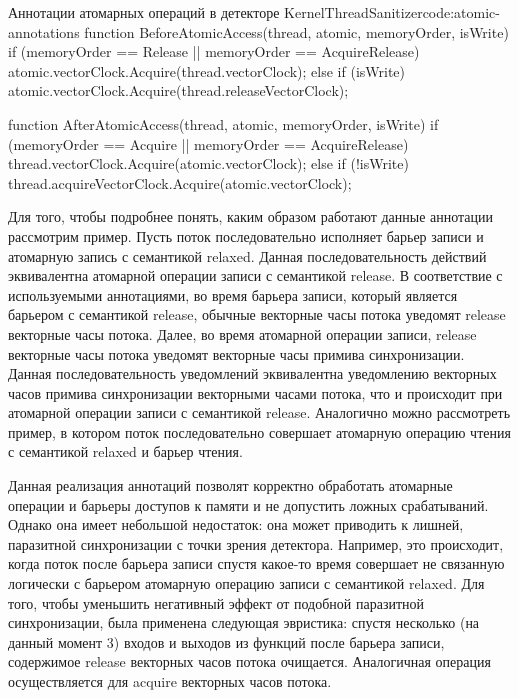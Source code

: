 \begin{listing}{Аннотации атомарных операций в детекторе KernelThreadSanitizer}{code:atomic-annotations}
function BeforeAtomicAccess(thread, atomic, memoryOrder, isWrite) {
  if (memoryOrder == Release || memoryOrder == AcquireRelease) {
    atomic.vectorClock.Acquire(thread.vectorClock);
  } else if (isWrite) {
    atomic.vectorClock.Acquire(thread.releaseVectorClock);
  }
}

function AfterAtomicAccess(thread, atomic, memoryOrder, isWrite) {
  if (memoryOrder == Acquire || memoryOrder == AcquireRelease) {
    thread.vectorClock.Acquire(atomic.vectorClock);
  } else if (!isWrite) {
    thread.acquireVectorClock.Acquire(atomic.vectorClock);
  }
}
\end{listing}

Для того, чтобы подробнее понять, каким образом работают данные аннотации рассмотрим пример.
Пусть поток последовательно исполняет барьер записи и атомарную запись с семантикой relaxed.
Данная последовательность действий эквивалентна атомарной операции записи с семантикой release.
В соответствие с используемыми аннотациями, во время барьера записи, который является барьером с семантикой release, обычные векторные часы потока уведомят release векторные часы потока.
Далее, во время атомарной операции записи, release векторные часы потока уведомят векторные часы примива синхронизации.
Данная последовательность уведомлений эквивалентна уведомлению векторных часов примива синхронизации векторными часами потока, что и происходит при атомарной операции записи с семантикой release.
Аналогично можно рассмотреть пример, в котором поток последовательно совершает атомарную операцию чтения с семантикой relaxed и барьер чтения.

Данная реализация аннотаций позволят корректно обработать атомарные операции и барьеры доступов к памяти и не допустить ложных срабатываний.
Однако она имеет небольшой недостаток: она может приводить к лишней, паразитной синхронизации с точки зрения детектора.
Например, это происходит, когда поток после барьера записи спустя какое-то время совершает не связанную логически с барьером атомарную операцию записи с семантикой relaxed.
Для того, чтобы уменьшить негативный эффект от подобной паразитной синхронизации, была применена следующая эвристика: спустя несколько (на данный момент 3) входов и выходов из функций после барьера записи, содержимое release векторных часов потока очищается.
Аналогичная операция осуществляется для acquire векторных часов потока.

